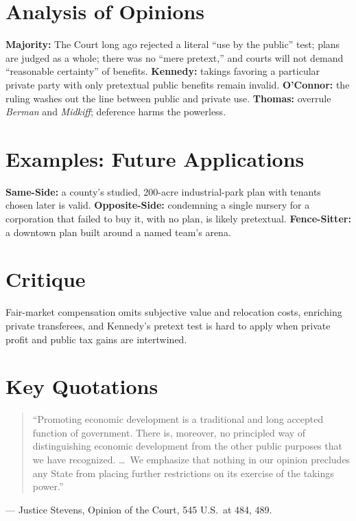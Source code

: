 \documentclass[12pt]{article}
\begin{document}
\section{Analysis of Opinions}
\textbf{Majority:} The Court long ago rejected a literal ``use by the public'' test; plans are judged as a whole; there was no ``mere pretext,'' and courts will not demand ``reasonable certainty'' of benefits. \textbf{Kennedy:} takings favoring a particular private party with only pretextual public benefits remain invalid. \textbf{O'Connor:} the ruling washes out the line between public and private use. \textbf{Thomas:} overrule \textit{Berman} and \textit{Midkiff}; deference harms the powerless.

\section{Examples: Future Applications}
\textbf{Same-Side:} a county's studied, 200-acre industrial-park plan with tenants chosen later is valid. \textbf{Opposite-Side:} condemning a single nursery for a corporation that failed to buy it, with no plan, is likely pretextual. \textbf{Fence-Sitter:} a downtown plan built around a named team's arena.

\section{Critique}
Fair-market compensation omits subjective value and relocation costs, enriching private transferees, and Kennedy's pretext test is hard to apply when private profit and public tax gains are intertwined.

\section{Key Quotations}
\begin{quote}
``Promoting economic development is a traditional and long accepted function of government. There is, moreover, no principled way of distinguishing economic development from the other public purposes that we have recognized. \dots\ We emphasize that nothing in our opinion precludes any State from placing further restrictions on its exercise of the takings power.''
\end{quote}
\noindent --- Justice Stevens, Opinion of the Court, 545 U.S.\ at 484, 489.
\end{document}
